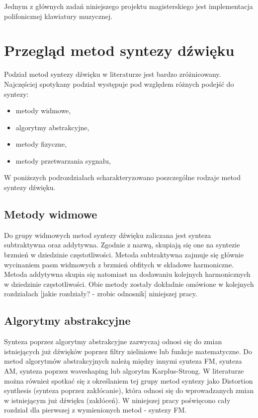 %
%

Jednym z głównych zadań niniejszego projektu magisterskiego jest implementacja polifonicznej klawiatury muzycznej.



\section{Przegląd metod syntezy dźwięku}
Podział metod syntezy dźwięku w literaturze jest bardzo zróżnicowany. Najczęściej spotykany podział występuje pod względem różnych podejść do syntezy:
\begin{itemize}
	\item metody widmowe,
	\item algorytmy abstrakcyjne,
	\item metody fizyczne,
	\item metody przetwarzania sygnału,
\end{itemize}

W poniższych podrozdziałach scharakteryzowano poszczególne rodzaje metod syntezy dźwięku.

\subsection{Metody widmowe}
Do grupy widmowych metod syntezy dźwięku zaliczana jest synteza subtraktywna oraz addytywna. Zgodnie z nazwą, skupiają się one na syntezie brzmień w dziedzinie częstotliwości. Metoda subtraktywna zajmuje się głównie wycinaniem pasm widmowych z brzmień obfitych w składowe harmoniczne. Metoda addytywna skupia się natomiast na dodawaniu kolejnych harmonicznych w dziedzinie częstotliwości. Obie metody zostały dokładnie omówione w kolejnych rozdziałach [jakie rozdziały? - zrobic odnosnik] niniejszej pracy.

\subsection{Algorytmy abstrakcyjne}
Synteza poprzez algorytmy abstrakcyjne zazwyczaj odnosi się do zmian istniejących już dźwięków poprzez filtry nieliniowe lub funkcje matematyczne. Do metod algorytmów abstrakcyjnych należą między innymi synteza FM, synteza AM, synteza poprzez waveshaping lub algorytm Karplus-Strong. W literaturze można również spotkać się z określaniem tej grupy metod syntezy jako Distortion synthesis (synteza poprzez zakłócanie), która odnosi się do wprowadzanych zmian w istniejącym już dźwięku (zakłóceń). W niniejszej pracy poświęcono cały rozdział dla pierwszej z wymienionych metod - syntezy FM.

